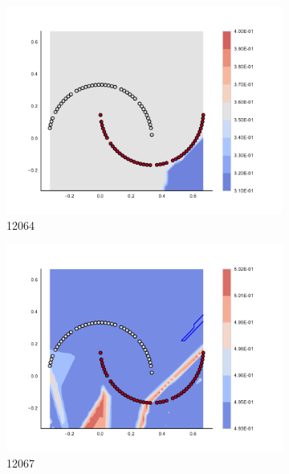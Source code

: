 \begin{figure}[h]
\begin{subfigure}[b]{0.09\textwidth}
    \includegraphics[clip, trim=2.35cm 1.75cm 4.5cm 0cm,width=\textwidth]{img/convergence/12064.pdf}
    \caption{12064}
    \label{fig:convergence_12064}
\end{subfigure}
%
\begin{subfigure}[b]{0.09\textwidth}
    \includegraphics[clip, trim=2.35cm 1.75cm 4.5cm 0cm,width=\textwidth]{img/convergence/12067.pdf}
    \caption{12067}
    \label{fig:convergence_12067}
\end{subfigure}
%
\begin{subfigure}[b]{0.09\textwidth}

\end{subfigure}
\end{figure}
